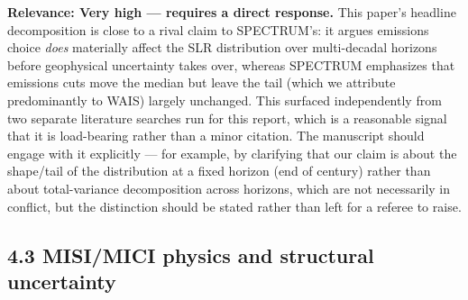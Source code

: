 \documentclass[11pt]{article}
\begin{document}
\noindent\textbf{Relevance: Very high --- requires a direct response.} This
paper's headline decomposition is close to a rival claim to SPECTRUM's: it
argues emissions choice \emph{does} materially affect the SLR distribution
over multi-decadal horizons before geophysical uncertainty takes over,
whereas SPECTRUM emphasizes that emissions cuts move the median but leave
the tail (which we attribute predominantly to WAIS) largely unchanged. This
surfaced independently from two separate literature searches run for this
report, which is a reasonable signal that it is load-bearing rather than a
minor citation. The manuscript should engage with it explicitly --- for
example, by clarifying that our claim is about the shape/tail of the
distribution at a fixed horizon (end of century) rather than about
total-variance decomposition across horizons, which are not necessarily in
conflict, but the distinction should be stated rather than left for a
referee to raise.

\subsection*{4.3 MISI/MICI physics and structural uncertainty}
\end{document}
